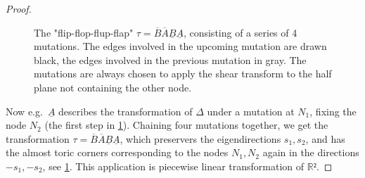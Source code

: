 \documentclass[12pt,a4paper,draft]{scrartcl}
\begin{document}
\begin{proof}
\begin{figure}
    \caption{The "flip-flop-flup-flap" $τ = \overline{B} \overline{A} \underline{B} \underline{A}$, consisting of a series of 4 mutations. The edges involved in the upcoming mutation are drawn black, the edges involved in the previous mutation in gray. The mutations are always chosen to apply the shear transform to the half plane not containing the other node.}
    \label{fig:flip-flop-flup-flap}
  \end{figure}

  Now e.g.\ $\underline{A}$ describes the transformation of $Δ$ under a mutation at $N_1$, fixing the node $N_2$ (the first step in \cref{fig:flip-flop-flup-flap}).
  Chaining four mutations together, we get the transformation $τ = \overline{B} \overline{A} \underline{B} \underline{A}$, which preservers the eigendirections $s_1,s_2$, and has the almost toric corners corresponding to the nodes $N_1,N_2$ again in the directions $-s_1,-s_2$, see \cref{fig:flip-flop-flup-flap}.
  This application is piecewise linear transformation of $ℝ²$.


\end{proof}
\end{document}
